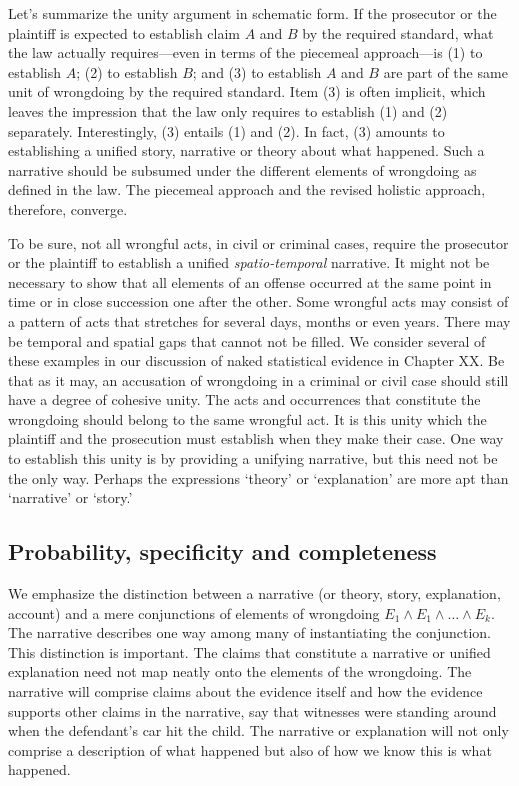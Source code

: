\documentclass[
  10pt,
  dvipsnames,enabledeprecatedfontcommands]{scrartcl}
\begin{document}
Let's summarize the unity argument in schematic form. If the prosecutor
or the plaintiff is expected to establish claim \(A\) and \(B\) by the
required standard, what the law actually requires---even in terms of the
piecemeal approach---is (1) to establish \(A\); (2) to establish \(B\);
and (3) to establish \(A\) and \(B\) are part of the same unit of
wrongdoing by the required standard. Item (3) is often implicit, which
leaves the impression that the law only requires to establish (1) and
(2) separately. Interestingly, (3) entails (1) and (2). In fact, (3)
amounts to establishing a unified story, narrative or theory about what
happened. Such a narrative should be subsumed under the different
elements of wrongdoing as defined in the law. The piecemeal approach and
the revised holistic approach, therefore, converge.

To be sure, not all wrongful acts, in civil or criminal cases, require
the prosecutor or the plaintiff to establish a unified
\emph{spatio-temporal} narrative. It might not be necessary to show that
all elements of an offense occurred at the same point in time or in
close succession one after the other. Some wrongful acts may consist of
a pattern of acts that stretches for several days, months or even years.
There may be temporal and spatial gaps that cannot not be filled. We
consider several of these examples in our discussion of naked
statistical evidence in Chapter XX.  Be that
as it may, an accusation of wrongdoing in a criminal or civil case
should still have a degree of cohesive unity. The acts and occurrences
that constitute the wrongdoing should belong to the same wrongful act.
It is this unity which the plaintiff and the prosecution must establish
when they make their case. One way to establish this unity is by
providing a unifying narrative, but this need not be the only way.
Perhaps the expressions `theory' or `explanation' are more apt than
`narrative' or `story.'

\hypertarget{probability-specificity-and-completeness}{%
\subsection{Probability, specificity and
completeness}\label{probability-specificity-and-completeness}}

We emphasize the distinction between a narrative (or theory, story,
explanation, account) and a mere conjunctions of elements of wrongdoing
\(E_1\wedge E_1 \wedge \dots \wedge E_k\). The narrative describes one
way among many of instantiating the conjunction. This distinction is
important. The claims that constitute a narrative or unified explanation
need not map neatly onto the elements of the wrongdoing. The narrative
will comprise claims about the evidence itself and how the evidence
supports other claims in the narrative, say that witnesses were standing
around when the defendant's car hit the child. The narrative or
explanation will not only comprise a description of what happened but
also of how we know this is what happened.
\end{document}
